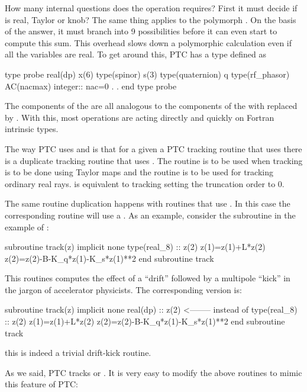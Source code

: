 \documentclass[english,12pt,article]{article} %
\begin{document}
{How many internal questions does the \vn{+} operation requires?   First it must decide if  is real, Taylor or knob?  The same thing applies to the polymorph . On the basis of the answer, it must branch into  9 possibilities before it can even start to compute this sum.   This overhead slows down a polymorphic calculation even if all the variables are real.
To get around this, PTC has a type  defined as
\begin{example}
  type probe
    real(dp) x(6)
    type(spinor) s(3)
    type(quaternion) q
    type(rf_phasor)  AC(nacmax)
    integer:: nac=0
      .
      .
  end type probe
\end{example}
The components of the  are all analogous to the components of the  with  replaced by . With this, most operations are acting directly and quickly on Fortran intrinsic types.

The way PTC uses  and  is that for a given a PTC tracking routine that uses  there is a duplicate tracking routine that uses . The  routine is to be used when tracking is to be done using Taylor maps and the  routine is to be used for tracking ordinary real rays.  is equivalent to tracking  setting the truncation order to 0.

The same routine duplication happens with routines that use . In this case the corresponding routine will use a . As an example, consider the subroutine in the example of :
\begin{code}
  subroutine track(z)
  implicit none
  type(real_8) :: z(2) 
  z(1)=z(1)+L*z(2) 
  z(2)=z(2)-B-K_q*z(1)-K_s*z(1)**2 
  end subroutine track
\end{code}

This routines computes the effect of a ``drift'' followed by a multipole ``kick'' in the jargon of accelerator physicists.  The corresponding  version is:
\begin{code}
  subroutine track(z)
  implicit none
  real(dp) :: z(2)            <-------- instead of type(real_8) :: z(2) 
  z(1)=z(1)+L*z(2) 
  z(2)=z(2)-B-K_q*z(1)-K_s*z(1)**2 
  end subroutine track
\end{code}
this is indeed a trivial  drift-kick routine.   
 
    
As we said, PTC tracks  or  .  It is very easy to modify the above routines to mimic this feature of PTC:

}
\end{document}
